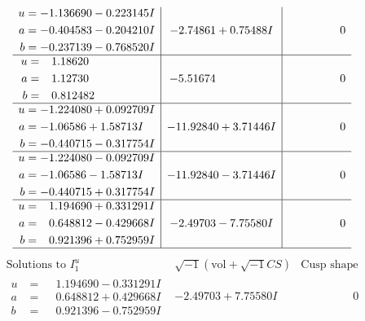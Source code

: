 \documentclass[1p]{elsarticle_modified}
\theoremstyle{definition}
\newcommand{\I}{\sqrt{-1}}
\begin{document}
$$\begin{array}{c|c|c}
\begin{aligned}
u &= -1.136690 - 0.223145 I \\
a &= -0.404583 - 0.204210 I \\
b &= -0.237139 - 0.768520 I\end{aligned}
 & -2.74861 + 0.75488 I & \phantom{-0.000000 } 0 \\ \hline\begin{aligned}
u &= \phantom{-}1.18620\phantom{ +0.000000I} \\
a &= \phantom{-}1.12730\phantom{ +0.000000I} \\
b &= \phantom{-}0.812482\phantom{ +0.000000I}\end{aligned}
 & -5.51674\phantom{ +0.000000I} & \phantom{-0.000000 } 0 \\ \hline\begin{aligned}
u &= -1.224080 + 0.092709 I \\
a &= -1.06586 + 1.58713 I \\
b &= -0.440715 - 0.317754 I\end{aligned}
 & -11.92840 + 3.71446 I & \phantom{-0.000000 } 0 \\ \hline\begin{aligned}
u &= -1.224080 - 0.092709 I \\
a &= -1.06586 - 1.58713 I \\
b &= -0.440715 + 0.317754 I\end{aligned}
 & -11.92840 - 3.71446 I & \phantom{-0.000000 } 0 \\ \hline\begin{aligned}
u &= \phantom{-}1.194690 + 0.331291 I \\
a &= \phantom{-}0.648812 - 0.429668 I \\
b &= \phantom{-}0.921396 + 0.752959 I\end{aligned}
 & -2.49703 - 7.75580 I & \phantom{-0.000000 } 0\\
 \hline 
 \end{array}$$\newpage$$\begin{array}{c|c|c}  
\text{Solutions to }I^u_{1}& \I (\text{vol} + \sqrt{-1}CS) & \text{Cusp shape}\\
 \hline 
\begin{aligned}
u &= \phantom{-}1.194690 - 0.331291 I \\
a &= \phantom{-}0.648812 + 0.429668 I \\
b &= \phantom{-}0.921396 - 0.752959 I\end{aligned}
 & -2.49703 + 7.75580 I & \phantom{-0.000000 } 0 \\ \hline\begin{aligned}

\end{aligned}
\end{array}$$
\end{document}
